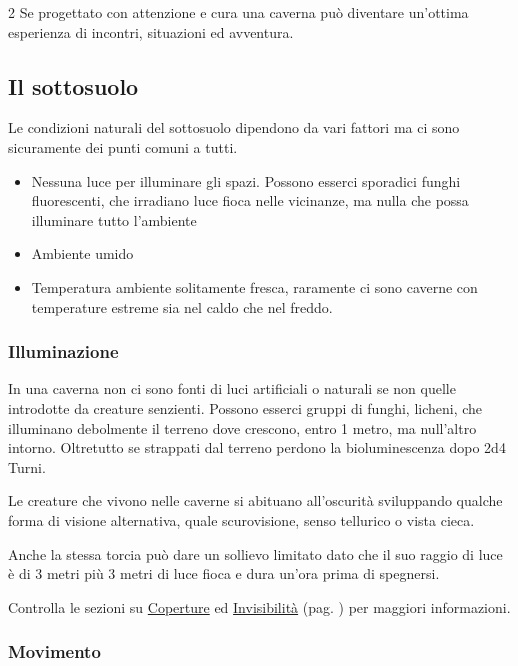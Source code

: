 \begin{multicols}{2}
Se progettato con attenzione e cura una caverna può diventare un'ottima esperienza di incontri, situazioni ed avventura.

\subsection{Il sottosuolo}

Le condizioni naturali del sottosuolo dipendono da vari fattori ma ci sono sicuramente dei punti comuni a tutti.

\begin{itemize}[leftmargin=*] \setlength{\itemsep}{0pt}
\item Nessuna luce per illuminare gli spazi. Possono esserci sporadici funghi fluorescenti, che irradiano luce fioca nelle vicinanze, ma nulla che possa illuminare tutto l'ambiente
\item Ambiente umido
\item Temperatura ambiente solitamente fresca, raramente ci sono caverne con temperature estreme sia nel caldo che nel freddo.
\end{itemize}

\subsubsection{Illuminazione}

In una caverna non ci sono fonti di luci artificiali o naturali se non quelle introdotte da creature senzienti. Possono esserci gruppi di funghi, licheni, che illuminano debolmente il terreno dove crescono, entro 1 metro, ma null'altro intorno.
Oltretutto se strappati dal terreno perdono la bioluminescenza dopo 2d4 Turni.

Le creature che vivono nelle caverne si abituano all'oscurità sviluppando qualche forma di visione alternativa, quale scurovisione, senso tellurico o vista cieca.

Anche la stessa torcia può dare un sollievo limitato dato che il suo raggio di luce è di 3 metri più 3 metri di luce fioca e dura un'ora prima di spegnersi.

Controlla le sezioni su \hyperlink{copertura}{Coperture} ed \hyperlink{invisibilita}{Invisibilità} (pag. \pageref{invisibilita}) per maggiori informazioni.

\subsubsection{Movimento}


\end{multicols}
